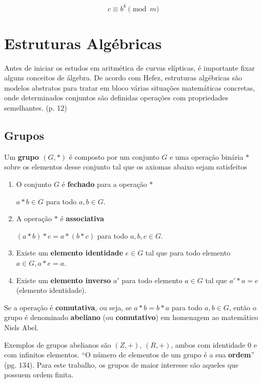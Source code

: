 \begin{equation}
  c \equiv b^k\pmod m \label{eq:4}
\end{equation}

%
%
\section{Estruturas Algébricas}

Antes de iniciar os estudos em aritmética de curvas elípticas, é importante
fixar alguns conceitos de álgebra. De acordo com Hefez, estruturas algébricas são modelos abstratos para tratar em bloco várias situações matemáticas concretas, onde determinados conjuntos são definidas operações com propriedades semelhantes. \cite{Hefez:2008} (p. 12)

%
%
\subsection{Grupos}

Um \textbf{grupo \((G,*)\)} é composto por um conjunto \(G\) e uma operação binária \(*\) sobre os elementos desse conjunto tal que os axiomas abaixo sejam satisfeitos \cite{Gilbert:2004}

\begin{enumerate}
\item O conjunto \(G\) é \textbf{fechado} para a operação \(*\)

$a * b \in G$ para todo $a,b \in G$.

\item A operação $*$ é \textbf{associativa}

$(a * b) * c = a * (b * c)$ para todo $a,b,c \in G$.

\item Existe um \textbf{elemento identidade} $e \in G$ tal que para todo elemento $a \in G, a * e = a$.
\item Existe um \textbf{elemento inverso} \(a'\) para todo elemento $a \in G$ tal que $a' * a = e$ (elemento identidade).
\end{enumerate}

Se a operação é \textbf{comutativa}, ou seja, se $a * b = b * a$ para todo $a, b \in G$, então o grupo é denominado \textbf{abeliano} (ou \textbf{comutativo}) em homenagem ao matemático Niels Abel. \cite{Gilbert:2004}

Exemplos de grupos abelianos são $(Z, +)$, $(R, +)$, ambos com identidade 0 e com infinitos elementos. ``O número de elementos de um grupo é a sua \textbf{ordem}'' \cite{Coutinho:2014} (pg. 134). Para este trabalho, os grupos de maior interesse são aqueles que possuem ordem finita.

